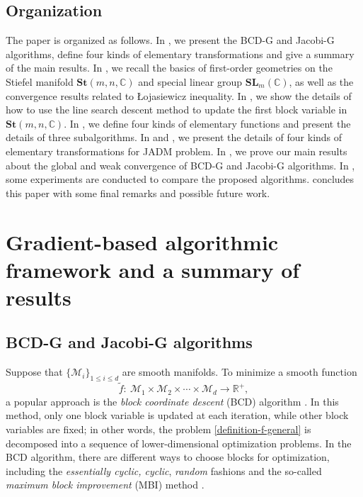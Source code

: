 \documentclass[final,onefignum,onetabnum]{siamart190516}
\newcommand{\RR}{\mathbb{R}}
\newcommand{\CC}{\mathbb{C}}
\newcommand{\SL}{\mathbf{SL}}
\newcommand{\St}{\mathbf{St}}
\begin{document}
\subsection{Organization}
The paper is organized as follows. In , we present the BCD-G and Jacobi-G algorithms, define four kinds of elementary transformations and give a summary of the main results. 
In , we recall the basics
of first-order geometries on the Stiefel manifold $\St(m,n,\CC)$ and special linear group $\SL_{m}(\CC)$, as well as the convergence results related to \L{}ojasiewicz inequality. 
In , we show the details of how to use the line search descent method to update the first block variable in $\St(m,n,\CC)$. 
In , we define four kinds of elementary functions and present the details of three subalgorithms. 
In  and , we present the details of four kinds of elementary transformations for JADM problem. 
In , 
we prove our main results about the global and weak convergence of BCD-G and Jacobi-G algorithms. 
In , some experiments are conducted to compare the proposed algorithms. 
 concludes this paper with some final remarks and possible future work. 

\section{Gradient-based algorithmic framework and a summary of results}\label{sec:back_summary}

\subsection{BCD-G and Jacobi-G algorithms}\label{subsecc:bcd-g}

Suppose that $\{\mathcal{M}_i\}_{1\leq i\leq d}$ are smooth manifolds. 
To minimize a smooth function 
\begin{equation}\label{definition-f-general}
\tilde{f}:\ \mathcal{M}_1\times\mathcal{M}_2\times\cdots\times\mathcal{M}_d \longrightarrow \RR^{+},
\end{equation}
a popular approach is the \emph{block coordinate descent} (BCD) algorithm  \cite{bertsekas1997nonlinear,luo1992convergence,luo1993error,wright2015coordinate,xu2013block,li2019polar}.
In this method, only one block variable is updated at each iteration, while other block variables are fixed; in other words, 
the problem \cref{definition-f-general} is decomposed into a sequence of lower-dimensional optimization problems. 
In the BCD algorithm, 
there are different ways to choose blocks for optimization, including the \emph{essentially cyclic, cyclic}, \emph{random} fashions \cite{wright2015coordinate,xu2013block} and the so-called 
\emph{maximum block improvement} (MBI) method \cite{chen2012maximum,li2015convergence}. 
\end{document}
